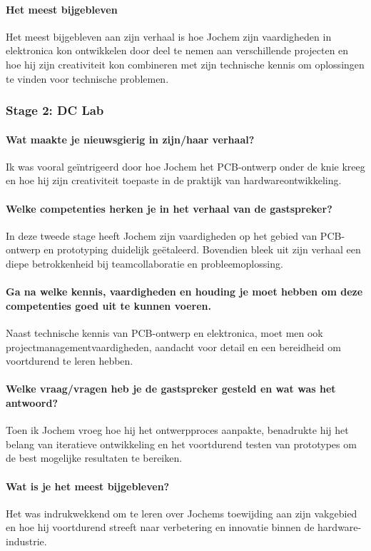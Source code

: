 \paragraph{Het meest bijgebleven} 
Het meest bijgebleven aan zijn verhaal is hoe Jochem zijn vaardigheden in elektronica kon ontwikkelen door deel te nemen aan verschillende projecten en hoe hij zijn creativiteit kon combineren met zijn technische kennis om oplossingen te vinden voor technische problemen.

\subsubsection{Stage 2: DC Lab}
\paragraph{Wat maakte je nieuwsgierig in zijn/haar verhaal?}
Ik was vooral geïntrigeerd door hoe Jochem het PCB-ontwerp onder de knie kreeg en hoe hij zijn creativiteit toepaste in de praktijk van hardwareontwikkeling.

\paragraph{Welke competenties herken je in het verhaal van de gastspreker?}
In deze tweede stage heeft Jochem zijn vaardigheden op het gebied van PCB-ontwerp en prototyping duidelijk geëtaleerd. Bovendien bleek uit zijn verhaal een diepe betrokkenheid bij teamcollaboratie en probleemoplossing.

\paragraph{Ga na welke kennis, vaardigheden en houding je moet hebben om deze competenties goed uit te kunnen voeren.}
Naast technische kennis van PCB-ontwerp en elektronica, moet men ook projectmanagementvaardigheden, aandacht voor detail en een bereidheid om voortdurend te leren hebben.

\paragraph{Welke vraag/vragen heb je de gastspreker gesteld en wat was het antwoord?}
Toen ik Jochem vroeg hoe hij het ontwerpproces aanpakte, benadrukte hij het belang van iteratieve ontwikkeling en het voortdurend testen van prototypes om de best mogelijke resultaten te bereiken.

\paragraph{Wat is je het meest bijgebleven?}
Het was indrukwekkend om te leren over Jochems toewijding aan zijn vakgebied en hoe hij voortdurend streeft naar verbetering en innovatie binnen de hardware-industrie.
